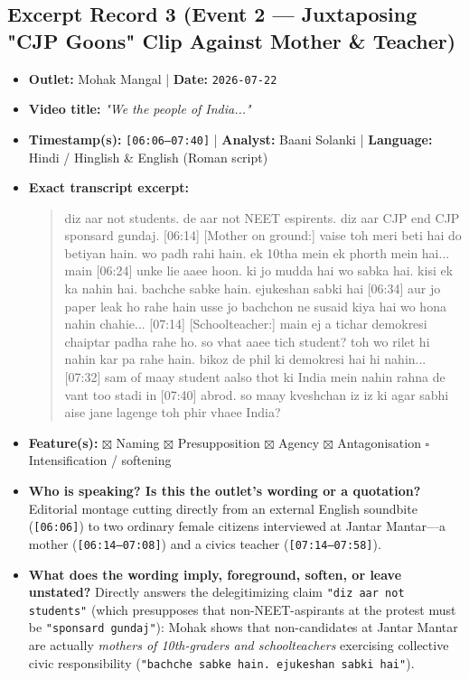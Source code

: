 \documentclass[10pt,a4paper]{article}
\begin{document}
\subsection*{Excerpt Record 3 (Event 2 --- Juxtaposing "CJP Goons" Clip Against Mother \& Teacher)}
\begin{itemize}[leftmargin=1.5em, itemsep=3pt, topsep=4pt]
  \item \textbf{Outlet:} Mohak Mangal | \textbf{Date:} \texttt{2026-07-22}
  \item \textbf{Video title:} \textit{"We the people of India..."}
  \item \textbf{Timestamp(s):} \texttt{[06:06--07:40]} | \textbf{Analyst:} Baani Solanki | \textbf{Language:} Hindi / Hinglish \& English (Roman script)
  \item \textbf{Exact transcript excerpt:}
    \begin{quote}\small\ttfamily [06:06] [Clip:] diz aar not students. de aar not NEET espirents. diz aar CJP end CJP sponsard gundaj. [06:14] [Mother on ground:] vaise toh meri beti hai do betiyan hain. wo padh rahi hain. ek 10tha mein ek phorth mein hai... main [06:24] unke lie aaee hoon. ki jo mudda hai wo sabka hai. kisi ek ka nahin hai. bachche sabke hain. ejukeshan sabki hai [06:34] aur jo paper leak ho rahe hain usse jo bachchon ne susaid kiya hai wo hona nahin chahie... [07:14] [Schoolteacher:] main ej a tichar demokresi chaiptar padha rahe ho. so vhat aaee tich student? toh wo rilet hi nahin kar pa rahe hain. bikoz de phil ki demokresi hai hi nahin... [07:32] sam of maay student aalso thot ki India mein nahin rahna de vant too stadi in [07:40] abrod. so maay kveshchan iz iz ki agar sabhi aise jane lagenge toh phir vhaee India?\end{quote}
  \item \textbf{Feature(s):} $\boxtimes$ Naming $\boxtimes$ Presupposition $\boxtimes$ Agency $\boxtimes$ Antagonisation $\square$ Intensification / softening
  \item \textbf{Who is speaking? Is this the outlet's wording or a quotation?} Editorial montage cutting directly from an external English soundbite (\texttt{[06:06]}) to two ordinary female citizens interviewed at Jantar Mantar---a mother (\texttt{[06:14--07:08]}) and a civics teacher (\texttt{[07:14--07:58]}).
  \item \textbf{What does the wording imply, foreground, soften, or leave unstated?} Directly answers the delegitimizing claim \texttt{"diz aar not students"} (which presupposes that non-NEET-aspirants at the protest must be \texttt{"sponsard gundaj"}): Mohak shows that non-candidates at Jantar Mantar are actually \textit{mothers of 10th-graders and schoolteachers} exercising collective civic responsibility (\texttt{"bachche sabke hain. ejukeshan sabki hai"}).

\end{itemize}
\end{document}
